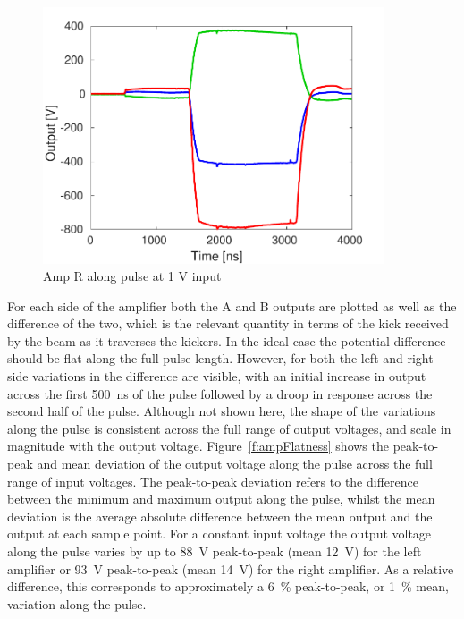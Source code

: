 \begin{figure}
  \centering
  \includegraphics[width=0.9\textwidth]{Figures/commissioning/AmpR_Traces}
  \caption{Amp R along pulse at 1 V input}
  \label{f:ampRTraces}
\end{figure}

For each side of the amplifier both the A and B outputs are plotted as well as the difference of the two, which is the relevant quantity in terms of the kick received by the beam as it traverses the kickers. In the ideal case the potential difference should be flat along the full pulse length. However, for both the left and right side variations in the difference are visible, with an initial increase in output across the first 500~ns of the pulse followed by a droop in response across the second half of the pulse. Although not shown here, the shape of the variations along the pulse is consistent across the full range of output voltages, and scale in magnitude with the output voltage. Figure~\ref{f:ampFlatness} shows the peak-to-peak and mean deviation of the output voltage along the pulse across the full range of input voltages. The peak-to-peak deviation refers to the difference between the minimum and maximum output along the pulse, whilst the mean deviation is the average absolute difference between the mean output and the output at each sample point. For a constant input voltage the output voltage along the pulse varies by up to 88~V peak-to-peak (mean 12~V) for the left amplifier or 93~V peak-to-peak (mean 14~V) for the right amplifier. As a relative difference, this corresponds to approximately a 6~\% peak-to-peak, or 1~\% mean, variation along the pulse.

